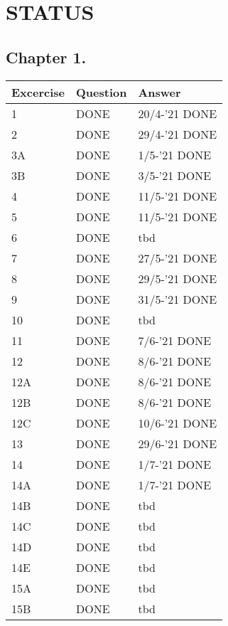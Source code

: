 \section{STATUS}

\subsection*{Chapter 1.}

    \begin{tabular}{|l|l|l|}
        \hline
        \rowcolor[HTML]{EFEFEF}
        {\color[HTML]{000000} Excercise } & {\color[HTML]{000000} Question } & {\color[HTML]{000000} Answer } \\ \hline
        1 & DONE & 20/4-'21 DONE \\ \hline
        2 & DONE & 29/4-'21 DONE \\ \hline
        3A & DONE & 1/5-'21 DONE \\ \hline
        3B & DONE & 3/5-'21 DONE \\ \hline
        4 & DONE & 11/5-'21 DONE \\ \hline
        5 & DONE & 11/5-'21 DONE \\ \hline
        6 & DONE & tbd \\ \hline
        7 & DONE & 27/5-'21 DONE \\ \hline
        8 & DONE & 29/5-'21 DONE \\ \hline
        9 & DONE & 31/5-'21 DONE \\ \hline
        10 & DONE & tbd \\ \hline
        11 & DONE & 7/6-'21 DONE \\ \hline
        12 & DONE & 8/6-'21 DONE \\ \hline
        12A & DONE & 8/6-'21 DONE \\ \hline
        12B & DONE & 8/6-'21 DONE \\ \hline
        12C & DONE & 10/6-'21 DONE \\ \hline
        13 & DONE & 29/6-'21 DONE \\ \hline
        14 & DONE & 1/7-'21 DONE \\ \hline
        14A & DONE & 1/7-'21 DONE \\ \hline
        14B & DONE & tbd \\ \hline
        14C & DONE & tbd \\ \hline
        14D & DONE & tbd \\ \hline
        14E & DONE & tbd \\ \hline
        15A & DONE & tbd \\ \hline
        15B & DONE & tbd \\ \hline
    \end{tabular}
